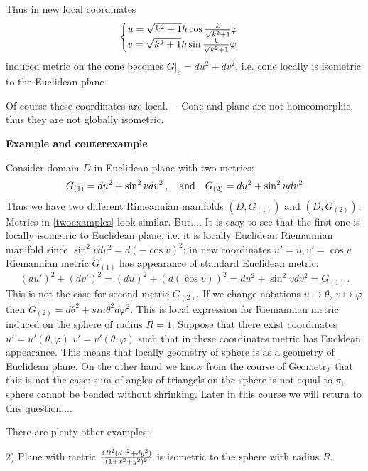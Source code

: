 \documentclass[12pt]{article}
\theoremstyle{theorem}
\numberwithin{equation}{section}
\begin{document}
{Thus in new local coordinates
                  $$
                  \begin{cases}
             u= \sqrt {k^2+1}h\cos {k\over \sqrt {k^2+1}}\varphi\cr
             v=  \sqrt {k^2+1} h\sin {k\over \sqrt {k^2+1}}\varphi\cr
                  \end{cases}
                  $$
induced metric on the cone becomes
$G\vert_c= du^2+dv^2$, i.e. cone locally is isometric to the Euclidean plane \finish

Of course these coordinates are local.---  Cone and plane are not homeomorphic, thus they are not globally isometric.

\m

{\bf Example and couterexample}

  Consider domain $D$ in Euclidean plane with two metrics:
              \begin{equation}\label{twoexamples}
    G_{(1)}=du^2+\sin^2v dv^2\,,\quad {\rm and}\quad
    G_{(2)}=du^2+\sin^2u dv^2
              \end{equation}
Thus we have two different Rimeannian manifolds $(D,G_{(1)})$
and $(D, G_{(2)})$.
Metrics in \eqref{twoexamples} look similar. But....
It is easy to see that the first one is locally
isometric to Euclidean plane, i.e. it is locally Euclidean Riemannian manifold
since $\sin^2 vdv^2=d(-\cos v)^2$: in new coordinates
$u'=u,v'=\cos v$ Riemannian metric $G_{(1)}$ has appearance of standard
Euclidean metric:
            $$
(du')^2+(dv')^2=(du)^2+(d(\cos v))^2=du^2+\sin^2 vdv^2=G_{(1)}\,.
            $$
This is not the case for second metric $G_{(2)}$. If we change notations
$u\mapsto \theta$, $v\mapsto \varphi$ then
 $G_{(2)}=d\theta^2+sin\theta^2 d\varphi^2$.
This is local
expression for Riemannian metric induced on the sphere of radius $R=1$.
Suppose that there exist coordinates $u'=u'(\theta,\varphi)$
 $v'=v'(\theta,\varphi)$ such that in these coordinates
metric has Eucldean appearance. This means that locally geometry of
sphere is as  a geometry of Euclidean plane.
On the other hand we know from the course of Geometry
that this is not the case:
sum of angles of triangels on the sphere is not equal to $\pi$,
sphere cannot be bended without shrinking. Later in this course we will
return to this question....

     \m

   There are plenty other examples:

      2) Plane with metric $4R^2(dx^2+dy^2)\over (1+x^2+y^2)^2$
is isometric to the sphere with radius $R$.

}
\end{document}
